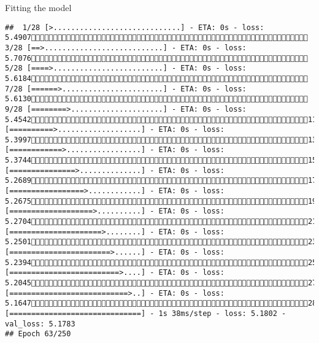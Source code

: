 \documentclass[
  ignorenonframetext,
]{beamer}
\begin{document}
\begin{frame}[fragile]{Fitting the model}
\begin{verbatim}
##  1/28 [>.............................] - ETA: 0s - loss: 5.4907 3/28 [==>...........................] - ETA: 0s - loss: 5.7076 5/28 [====>.........................] - ETA: 0s - loss: 5.6184 7/28 [======>.......................] - ETA: 0s - loss: 5.6130 9/28 [========>.....................] - ETA: 0s - loss: 5.454211/28 [==========>...................] - ETA: 0s - loss: 5.399713/28 [============>.................] - ETA: 0s - loss: 5.374415/28 [===============>..............] - ETA: 0s - loss: 5.268917/28 [=================>............] - ETA: 0s - loss: 5.267519/28 [===================>..........] - ETA: 0s - loss: 5.270421/28 [=====================>........] - ETA: 0s - loss: 5.250123/28 [=======================>......] - ETA: 0s - loss: 5.239425/28 [=========================>....] - ETA: 0s - loss: 5.204527/28 [===========================>..] - ETA: 0s - loss: 5.164728/28 [==============================] - 1s 38ms/step - loss: 5.1802 - val_loss: 5.1783
## Epoch 63/250

\end{verbatim}
\end{frame}
\end{document}
